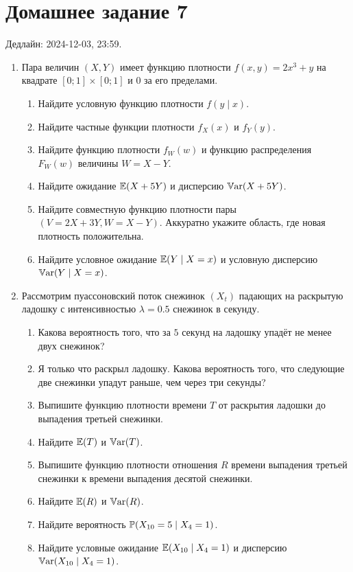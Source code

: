 \section*{Домашнее задание 7}


Дедлайн: 2024-12-03, 23:59.

\begin{enumerate}

\item Пара величин $(X, Y)$ имеет функцию плотности $f(x, y) = 2x^3 + y$ на квадрате $[0;1] \times [0;1]$ и $0$ за его пределами. 
\begin{enumerate}
    \item Найдите условную функцию плотности $f(y \mid x)$.
    \item Найдите частные функции плотности $f_X(x)$ и $f_Y(y)$.
    \item Найдите функцию плотности $f_W(w)$ и функцию распределения $F_W(w)$ величины $W = X - Y$. 
    \item Найдите ожидание $\E(X + 5Y)$ и дисперсию $\Var(X + 5Y)$.
    \item Найдите совместную функцию плотности пары $(V = 2X + 3Y, W = X - Y)$. Аккуратно укажите область, где новая плотность положительна. 
    \item Найдите условное ожидание $\E(Y \mid X = x)$ и условную дисперсию $\Var(Y \mid X = x)$.
\end{enumerate}

\item Рассмотрим пуассоновский поток снежинок $(X_t)$ падающих на раскрытую ладошку с интенсивностью $\lambda = 0.5$ снежинок в секунду.
\begin{enumerate}
    \item Какова вероятность того, что за $5$ секунд на ладошку упадёт не менее двух снежинок?
    \item Я только что раскрыл ладошку. Какова вероятность того, что следующие две снежинки упадут раньше, чем через три секунды?
    \item Выпишите функцию плотности времени $T$ от раскрытия ладошки до выпадения третьей снежинки. 
    \item Найдите $\E(T)$ и $\Var(T)$.
    \item Выпишите функцию плотности отношения $R$ времени выпадения третьей снежинки к времени выпадения десятой снежинки. 
    \item Найдите $\E(R)$ и $\Var(R)$.
    \item Найдите вероятность $\P(X_{10} = 5 \mid X_{4} = 1)$.
    \item Найдите условные ожидание $\E(X_{10} \mid X_{4} = 1)$ и дисперсию $\Var(X_{10} \mid X_4 = 1)$.
\end{enumerate}


\end{enumerate}
